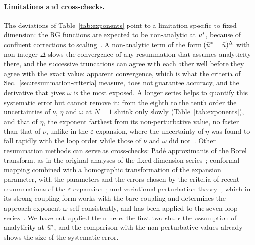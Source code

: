 \paragraph{Limitations and cross-checks.}
The deviations of Table~\ref{tab:exponents} point to a limitation specific to fixed dimension: the RG functions are
expected to be non-analytic at $\bar u^*$, because of confluent corrections to
scaling~\cite{Nickel1982,Nickel1991,PelissettoVicari1998,CalabreseEtAl2000,PelissettoVicari2002}. A non-analytic term of the form $(\bar u^*-\bar u)^{\Delta}$ with
non-integer $\Delta$ slows the convergence of any resummation that assumes analyticity there, and the successive
truncations can agree with each other well before they agree with the exact value: apparent convergence, which is
what the criteria of Sec.~\ref{sec:resummation-criteria} measure, does not guarantee accuracy, and the derivative
that gives $\omega$ is the most exposed. A longer series helps to quantify this systematic error
but cannot remove it: from the eighth to the tenth order the uncertainties of $\nu$, $\eta$ and $\omega$ at $N=1$
shrink only slowly (Table~\ref{tab:exponents}), and that of $\eta$, the exponent farthest from its non-perturbative
value, no faster than that of $\nu$, unlike in the $\varepsilon$ expansion, where the uncertainty of $\eta$ was found
to fall rapidly with the loop order while those of $\nu$ and $\omega$ did not~\cite{Shapoval2026}. Other
resummation methods can serve as cross-checks: Pad\'e approximants of the Borel transform,
as in the original analyses of the fixed-dimension series~\cite{BNGM1976,BNM1978,ZinnJustinBook}; conformal mapping
combined with a homographic transformation of the expansion parameter, with the parameters and the errors chosen by the
criteria of recent resummations of the $\varepsilon$ expansion~\cite{KompanietsPanzer2017,Shapoval2026}; and variational
perturbation theory~\cite{KleinertBook}, which in its strong-coupling form works with the bare coupling and determines the
approach exponent $\omega$ self-consistently, and has been applied to the seven-loop series~\cite{Kleinert1999}. We have
not applied them here: the first two share the assumption of analyticity at $\bar u^*$, and the comparison with the
non-perturbative values already shows the size of the systematic error.

